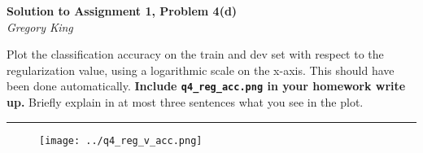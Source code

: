 \documentclass[letter,12pt]{article}
\newcommand{\myhwtitle}[3]
{\begin{center}
{\large {\bf Solution to Assignment {#1}, Problem {#2}}}\\
\medskip
{\it {#3}} %
\end{center}}
\newcommand{\solutionsAuthor}{Gregory King}
\begin{document}


\clearpage

\myhwtitle{1}{4(d)}{\solutionsAuthor}

\bigskip
\noindent Plot the classification accuracy on the train and dev set with respect to the regularization value, using a logarithmic scale on the x-axis. This should have been done automatically. \textbf{Include \texttt{q4\_reg\_acc.png} in your homework write up.} Briefly explain in at most three sentences what you see in the plot.\vspace{5mm}

\noindent\rule{\textwidth}{0.4pt}\vspace{5mm}

\begin{figure}[!h!p]
\begin{center}
\texttt{[image: ../q4\_reg\_v\_acc.png]}
\end{center}
\end{figure}


\end{document}
